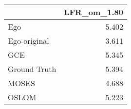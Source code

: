 \begin{tabular}{lr}
\toprule
{} & LFR_om_1.80 \\
\midrule
Ego          &       5.402 \\
Ego-original &       3.611 \\
GCE          &       5.345 \\
Ground Truth &       5.394 \\
MOSES        &       4.688 \\
OSLOM        &       5.223 \\
\bottomrule
\end{tabular}
